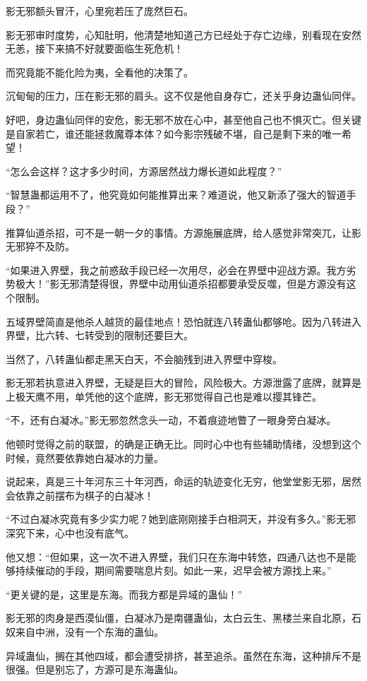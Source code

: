 \begin{this_body}
影无邪额头冒汗，心里宛若压了庞然巨石。

影无邪审时度势，心知肚明，他清楚地知道己方已经处于存亡边缘，别看现在安然无恙，接下来搞不好就要面临生死危机！

而究竟能不能化险为夷，全看他的决策了。

沉甸甸的压力，压在影无邪的肩头。这不仅是他自身存亡，还关乎身边蛊仙同伴。

好吧，身边蛊仙同伴的安危，影无邪不放在心中，甚至他自己也不惧灭亡。但关键是自家若亡，谁还能拯救魔尊本体？如今影宗残破不堪，自己是剩下来的唯一希望！

“怎么会这样？这才多少时间，方源居然战力爆长道如此程度？”

“智慧蛊都运用不了，他究竟如何能推算出来？难道说，他又新添了强大的智道手段？”

推算仙道杀招，可不是一朝一夕的事情。方源施展底牌，给人感觉非常突兀，让影无邪猝不及防。

“如果进入界壁，我之前惑敌手段已经一次用尽，必会在界壁中迎战方源。我方劣势极大！”影无邪清楚得很，界壁中动用仙道杀招都要承受反噬，但是方源没有这个限制。

五域界壁简直是他杀人越货的最佳地点！恐怕就连八转蛊仙都够呛。因为八转进入界壁，比六转、七转受到的限制还要巨大。

当然了，八转蛊仙都走黑天白天，不会脑残到进入界壁中穿梭。

影无邪若执意进入界壁，无疑是巨大的冒险，风险极大。方源泄露了底牌，就算是上极天鹰不用，单凭他的这个底牌，影无邪觉得自己也是难以撄其锋芒。

“不，还有白凝冰。”影无邪忽然念头一动，不着痕迹地瞥了一眼身旁白凝冰。

他顿时觉得之前的联盟，的确是正确无比。同时心中也有些辅助情绪，没想到这个时候，竟然要依靠她白凝冰的力量。

说起来，真是三十年河东三十年河西，命运的轨迹变化无穷，他堂堂影无邪，居然会依靠之前摆布为棋子的白凝冰！

“不过白凝冰究竟有多少实力呢？她到底刚刚接手白相洞天，并没有多久。”影无邪深究下来，心中也没有底气。

他又想：“但如果，这一次不进入界壁，我们只在东海中转悠，四通八达也不是能够持续催动的手段，期间需要喘息片刻。如此一来，迟早会被方源找上来。”

“更关键的是，这里是东海。而我方都是异域的蛊仙！”

影无邪的肉身是西漠仙僵，白凝冰乃是南疆蛊仙，太白云生、黑楼兰来自北原，石奴来自中洲，没有一个东海的蛊仙。

异域蛊仙，搁在其他四域，都会遭受排挤，甚至追杀。虽然在东海，这种排斥不是很强。但是别忘了，方源可是东海蛊仙。


\end{this_body}
